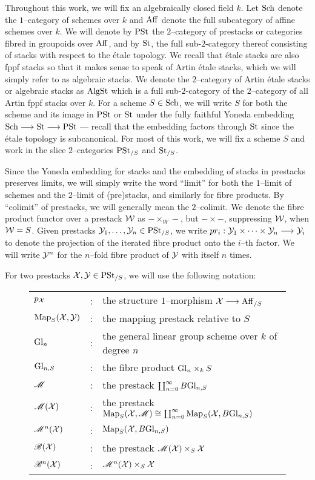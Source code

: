\documentclass[11pt]{amsart}
\begin{document}
Throughout this work, we will fix an algebraically closed field $k$.
Let $\mathrm{Sch}$ denote the $1$--category of schemes over $k$ and $\mathrm{Aff}$ denote the
full subcategory of affine schemes over $k$.
We will denote by $\mathrm{PSt}$ the $2$--category of
prestacks or categories fibred in groupoids over $\mathrm{Aff}$, and by
$\mathrm{St}$, the full sub-$2$-category thereof consisting of stacks with respect
to the \'etale topology.
We recall that \'etale stacks are also fppf stacks so that it
makes sense to speak of Artin \'etale stacks, which we will simply refer to as
algebraic stacks. We denote the $2$--category of Artin \'etale stacks
or algebraic stacks as $\mathrm{AlgSt}$ which is a full sub-$2$-category of the
$2$--category of all Artin fppf stacks over $k$.
For a scheme $S \in \mathrm{Sch}$, we will write $S$ for
both the scheme and its image in $\mathrm{PSt}$ or $\mathrm{St}$ under the fully faithful Yoneda
embedding $\Sch \to \St \to \PSt$ --- recall that the embedding factors through
$\mathrm{St}$ since the \'etale topology is subcanonical.
For most of this work, we will fix a scheme $S$ and work
in the slice $2$--categories $\mathrm{PSt}_{/S}$ and $\mathrm{St}_{/S}$.

Since the Yoneda embedding for stacks and the embedding of stacks in prestacks
preserves limits, we will simply write the word ``limit'' for both
the $1$--limit of schemes and the $2$--limit of (pre)stacks, and similarly for
fibre products. By ``colimit'' of prestacks, we will generally mean the
$2$--colimit. We denote the fibre product functor over a prestack $\mathcal{W}$ as
$- \times_W -$, but $- \times -$, suppressing $\mathcal{W}$, when $\mathcal{W} = S$.
Given prestacks $\mathcal{Y}_1, \dots, \mathcal{Y}_n \in \mathrm{PSt}_{/S}$, we write
$pr_i : \mcY_1 \times \cdots \times \mcY_n \to \mcY_i$ to denote the
projection of the iterated fibre product onto the $i$--th factor.
We will write $\mathcal{Y}^n$ for the $n$--fold fibre product of $\mathcal{Y}$ with itself $n$
times.

\begin{notn}
For two prestacks $\mathcal{X}, \mathcal{Y} \in \mathrm{PSt}_{/S}$, we will use the following
notation:
\begin{figure}[H]
\begin{tabularx}{\textwidth}{l c l}
$p_\mathcal{X}$ & : & the structure $1$--morphism $\mcX \to \Aff_{/S}$ \\
$\mathrm{Map}_S(\mathcal{X}, \mathcal{Y})$ & : & the mapping prestack relative to $S$ \\
$\mathrm{Gl}_{n}$ & : & the general linear group scheme over $k$ of degree $n$ \\
$\mathrm{Gl}_{n, S}$ & : & the fibre product $\mathrm{Gl}_{n} \times_k S$ \\
$\mathscr{M}$ & : & the prestack $\coprod_{n = 0}^\infty B\mathrm{Gl}_{n, S}$ \\
$\mathscr{M}(\mathcal{X})$ & : & the prestack
  $\mathrm{Map}_S(\mathcal{X}, \mathscr{M}) \cong \coprod_{n = 0}^\infty \mathrm{Map}_S(\mathcal{X}, B\mathrm{Gl}_{n, S})$ \\
$\mathscr{M}^n(\mathcal{X})$ & : & $\mathrm{Map}_S(\mathcal{X}, B\mathrm{Gl}_{n, S})$ \\
$\mathscr{B}(\mathcal{X})$ & : & the prestack $\mathscr{M}(\mathcal{X}) \times_S \mathcal{X}$ \\
$\mathscr{B}^n(\mathcal{X})$ & : & $\mathscr{M}^n(\mathcal{X}) \times_S \mathcal{X}$ \\
\end{tabularx}
\end{figure}
\end{notn}
\end{document}

